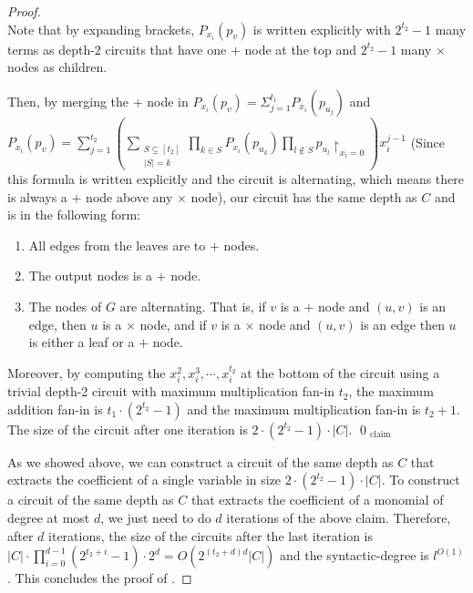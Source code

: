 \documentclass[11pt,letter]{article}
\theoremstyle{remark} %
\begin{document}
{\begin{proof}
\begin{equation*}
        \end{equation*}
        Note that by expanding  brackets, $P_{x_i}(p_v)$ is written explicitly with $2^{t_2}-1$ many terms as depth-2 circuits that have one $+$ node at the top and $2^{t_2}-1$ many $\times$ nodes as children.\par
        Then, by merging the $+$ node in $P_{x_i}(p_v) =  \Sigma_{j=1}^{t_1} P_{x_i}(p_{u_j}) $ and $ P_{x_i}(p_v) = \sum_{j=1}^{t_2} \left ( \sum_{\substack{S \subseteq [t_2] \\ |S| = k} } \prod_{k \in S } P_{x_i}(p_{u_k}  )  \prod_{l \notin S} p_{u_l}\restriction_{x_i =0}\right) x_i^{j-1}$ 
        (Since this formula is written explicitly and the circuit is alternating, which means there is always a $+$ node above any $\times$ node), our circuit has the same depth as $C$ and is in the following form:
         \begin{enumerate}
            \item All edges from the leaves are to $+$ nodes.
            \item The output nodes is a $+$ node.
            \item The nodes of $G$ are alternating. That is, if $v$ is a $+$ node and $(u,v)$ is an edge, then $u$ is a $\times$ node, and if $v$ is a $\times$ node and $(u,v)$ is an edge then $u$ is either a leaf or a $+$ node.
        \end{enumerate}
        Moreover, by computing the $x_i^2, x_i^3, \cdots, x_i^{t_2}$ at the bottom of the circuit using a trivial depth-2 circuit with maximum multiplication fan-in $t_2$, the maximum addition fan-in is $t_1\cdot (2^{t_2}-1)$ and the maximum multiplication fan-in is $t_2+1$. The size of the circuit after one iteration is $2\cdot (2^{t_2}-1) \cdot |C|$. \qed$_\text{claim}$
    
    \medskip
     As we showed above, we can construct a circuit of the same depth as $C$ that extracts the coefficient of a single variable in size $2\cdot (2^{t_2}-1) \cdot |C|$. To construct a circuit of the same depth as $C$ that extracts the coefficient of a monomial of degree at most $d$, we just need to do $d$ iterations of the above claim. Therefore, after $d$ iterations, the size of the circuits after the last iteration is $|C|\cdot \prod_{i=0}^{d-1} (2^{t_2+i}-1) \cdot 2^d=O(2^{(t_2+d)d}|C|)$ and the syntactic-degree is $l^{O(1)}$.
    This concludes the proof of .
    \end{proof} %


}
\end{document}
